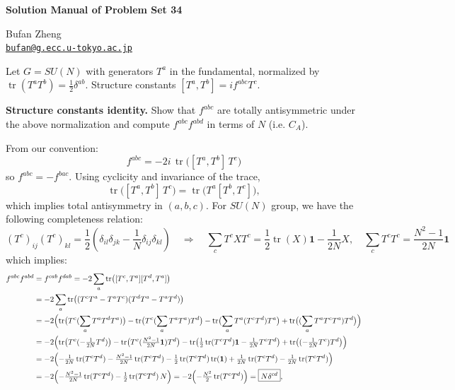 \resetproblem
\begin{center}
    {\LARGE \textbf{Solution Manual of Problem Set 34} \par}
    \vspace{1em}
    {\large Bufan Zheng\\ \href{mailto:bufan@g.ecc.u-tokyo.ac.jp}{\texttt{bufan@g.ecc.u-tokyo.ac.jp}} \par}
\end{center}

\noindent Let \(G=SU(N)\) with generators \(T^a\) in the fundamental, normalized by \(\operatorname{tr}(T^aT^b)=\frac{1}{2}\delta^{ab}\). Structure constants \([T^a,T^b]=if^{abc}T^c\).

\begin{problem}
    \textbf{Structure constants identity.} Show that \(f^{abc}\) are totally antisymmetric under the above normalization and compute \(f^{abc}f^{abd}\) in terms of \(N\) (i.e. \(C_A\)).
\end{problem}
\begin{solution}[34.1]
	From our convention:
	\[
	f^{abc}=-2i\,\operatorname{tr} \bigl([T^a,T^b]\,T^c\bigr)
	\]
	so \(f^{abc}=-f^{bac}\). Using cyclicity and invariance of the trace,
	\[
	\operatorname{tr}\bigl([T^a,T^b]\,T^c\bigr)=\operatorname{tr}\bigl(T^a[T^b,T^c]\bigr),
	\]
	which implies total antisymmetry in \((a,b,c)\). For $SU(N)$ group, we have the following completeness relation:
\[
(T^c)_{ij}(T^c)_{kl}=\frac12\left(\delta_{il}\delta_{jk}-\frac1N\delta_{ij}\delta_{kl}\right)
\quad\Longrightarrow\quad
\sum_c T^cXT^c=\frac12\operatorname{tr}(X)\mathbf1-\frac1{2N}X,
\quad
\sum_c T^cT^c=\frac{N^2-1}{2N}\mathbf1
\]
which implies:
\[
\begin{aligned}
	f^{abc}f^{abd}
	&=f^{cab}f^{dab}
	=-2\sum_a\operatorname{tr}\bigl([T^c,T^a][T^d,T^a]\bigr)\\
	&=-2\sum_a\operatorname{tr} \bigl((T^cT^a-T^aT^c)(T^dT^a-T^aT^d)\bigr)\\
	&=-2\Bigl(\operatorname{tr} \bigl(T^c(\sum_aT^aT^dT^a)\bigr)-\operatorname{tr} \bigl(T^c(\sum_aT^aT^a)T^d\bigr)-\operatorname{tr} \bigl(\sum_aT^a(T^cT^d)T^a\bigr)+\operatorname{tr} \bigl((\sum_aT^aT^cT^a)T^d\bigr)\Bigr)\\
	&=-2\Bigl(\operatorname{tr} \bigl(T^c(-\tfrac1{2N}T^d)\bigr)-\operatorname{tr} \bigl(T^c(\tfrac{N^2-1}{2N}\mathbf1)T^d\bigr)-\operatorname{tr} \bigl(\tfrac12\operatorname{tr}(T^cT^d)\mathbf1-\tfrac1{2N}T^cT^d\bigr)+\operatorname{tr} \bigl((-\tfrac1{2N}T^c)T^d\bigr)\Bigr)\\
	&=-2\Bigl(-\tfrac1{2N}\operatorname{tr}(T^cT^d)-\tfrac{N^2-1}{2N}\operatorname{tr}(T^cT^d)-\tfrac12\operatorname{tr}(T^cT^d)\operatorname{tr}(\mathbf1)+\tfrac1{2N}\operatorname{tr}(T^cT^d)-\tfrac1{2N}\operatorname{tr}(T^cT^d)\Bigr)\\
	&=-2\Bigl(-\tfrac{N^2-1}{2N}\operatorname{tr}(T^cT^d)-\tfrac12\operatorname{tr}(T^cT^d)\,N\Bigr)
	=-2\Bigl(-\tfrac{N^2}{2}\operatorname{tr}(T^cT^d)\Bigr)
	=\boxed{N\delta^{cd}},
\end{aligned}
\]
\end{solution}
